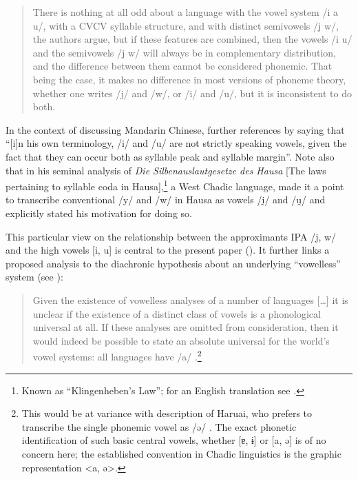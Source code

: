 \documentclass[output=paper]{langscibook}
\begin{document}
\begin{quote}\relax
There is nothing at all odd about a language with the vowel system /i a u/, with a CVCV syllable structure, and with distinct semivowels /j w/, the authors argue, but if these features are combined, then the vowels /i u/ and the semivowels /j w/ will always be in complementary distribution, and the difference between them cannot be considered phonemic. That being the case, it makes no difference in most versions of phoneme theory, whether one writes /j/ and /w/, or /i/ and /u/, but it is inconsistent to do both.
\end{quote}

In the context of discussing Mandarin Chinese, \citet[71]{Anderson2016} further references \citet[75]{Hockett1955} by saying that “[i]n his own terminology, /i/ and /u/ are not strictly speaking vowels, given the fact that they can occur both as syllable peak and syllable margin”. Note also that in his seminal analysis of \textit{Die Silbenauslautgesetze des Hausa} [The laws pertaining to syllable coda in Hausa],\footnote{Known as ``Klingenheben's Law''; for an English translation see \citet{Newman2004}.}  a West Chadic language, \citet{Klingenheben1927} made it a point to transcribe conventional /y/ and /w/ in Hausa as vowels /i̯/ and /u̯/ and explicitly stated his motivation for doing so.

This particular view on the relationship between the approximants IPA /j, w/ and the high vowels [i, u] is central to the present paper (). It further links a proposed analysis to the diachronic hypothesis about an underlying ``vowelless'' system (see ):

\begin{quote}\relax
Given the existence of vowelless analyses of a number of languages […] it is unclear if the existence of a distinct class of vowels is a phonological universal at all. If these analyses are omitted from consideration, then it would indeed be possible to state an absolute universal for the world’s vowel systems: all languages have /a/ \citep[102]{Anderson2016}.\footnote{This would be at variance with  description of Haruai, who prefers to transcribe the single phonemic vowel as /ə/ \citep[102]{Anderson2016}. The exact phonetic identification of such basic central vowels, whether [ɐ, ɨ] or [a, ə] is of no concern here; the established convention in Chadic linguistics is the graphic representation <a, ə>.}
\end{quote}
\end{document}
